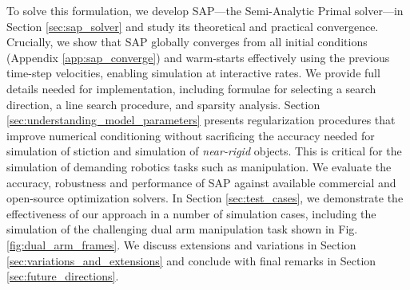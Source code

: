 To solve this formulation, we develop SAP---the Semi-Analytic Primal solver---in
Section \ref{sec:sap_solver} and study its theoretical and practical
convergence.  Crucially, we show that SAP globally converges from all initial
conditions (Appendix \ref{app:sap_converge}) and warm-starts effectively using
the previous time-step velocities, enabling simulation at interactive rates. We
provide full details needed for implementation, including formulae for selecting
a search direction, a line search procedure, and sparsity analysis. Section
\ref{sec:understanding_model_parameters} presents regularization procedures that
improve numerical conditioning without sacrificing the accuracy needed for
simulation of stiction and simulation of \emph{near-rigid} objects. This is
critical for the simulation of demanding robotics tasks such as manipulation. We
evaluate the accuracy, robustness and performance of SAP against available
commercial and open-source optimization solvers. In Section
\ref{sec:test_cases}, we demonstrate the effectiveness of our approach in a
number of simulation cases, including the simulation of the challenging dual arm
manipulation task shown in Fig. \ref{fig:dual_arm_frames}. We discuss extensions
and variations in Section \ref{sec:variations_and_extensions} and conclude with
final remarks in Section \ref{sec:future_directions}.
